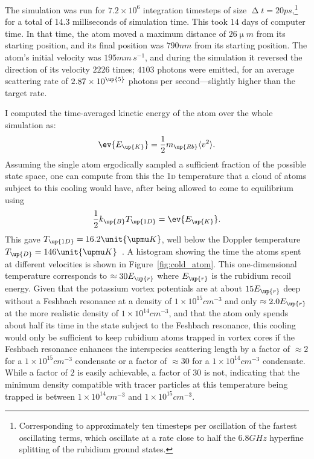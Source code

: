 The simulation was run for $7.2\times10^6$ integration timesteps of size $\upDelta t=20\unit{ps}$,\footnote{Corresponding to approximately ten timesteps per oscillation of the fastest oscillating terms, which oscillate at a rate close to half the $6.8\unit{GHz}$ hyperfine splitting of the rubidium ground states.} for a total of 14.3 milliseconds of simulation time. This took $14$ days of computer time. In that time, the atom moved a maximum distance of $26\unit{\upmu m}$ from its starting position, and its final position was $790\unit{nm}$ from its starting position. The atom's initial velocity was $195 \unit{mm\,s}^{-1}$, and during the simulation it reversed the direction of its velocity $2226$ times; $4103$ photons were emitted, for an average scattering rate of $2.87\times10^\up{5}$ photons per second---slightly higher than the target rate.

I computed the time-averaged kinetic energy of the atom over the whole simulation as:
\begin{equation}
\ev{E_\up{K}} = \frac12 m_\up{Rb} \langle v^2 \rangle.
\end{equation}
Assuming the single atom ergodically sampled a sufficient fraction of the possible state space, one can compute from this the \textsc{1d} temperature that a cloud of atoms subject to this cooling would have, after being allowed to come to equilibrium using
\begin{align}
\frac12 k_\up{B} T_\up{1D} = \ev{E_\up{K}}.
\end{align}
This gave $T_\up{1D} = 16.2\unit{\upmu K}$, well below the Doppler temperature $T_\up{D} = 146\unit{\upmu K}$~\cite{steck_rubidium_2015}. A histogram showing the time the atoms spent at different velocities is shown in Figure~\ref{fig:cold_atom}. This one-dimensional temperature corresponds to $\approx30E_\up{r}$ where $E_\up{r}$ is the rubidium recoil energy. Given that the potassium vortex potentials are at about $15E_\up{r}$ deep without a Feshbach resonance at a density of $1\times10^{15}\unit{cm}^{-3}$ and only $\approx 2.0E_\up{r}$ at the more realistic density of $1\times10^{14}\unit{cm}^{-3}$, and that the atom only spends about half its time in the state subject to the Feshbach resonance, this cooling would only be sufficient to keep rubidium atoms trapped in vortex cores if the Feshbach resonance enhances the interspecies scattering length by a factor of $\approx 2$ for a $1\times10^{15}\unit{cm}^{-3}$ condensate or a factor of $\approx 30$ for a $1\times10^{14}\unit{cm}^{-3}$ condensate. While a factor of $2$ is easily achievable, a factor of $30$ is not, indicating that the minimum density compatible with tracer particles at this temperature being trapped is between $1\times10^{14}\unit{cm}^{-3}$ and $1\times10^{15}\unit{cm}^{-3}$.

